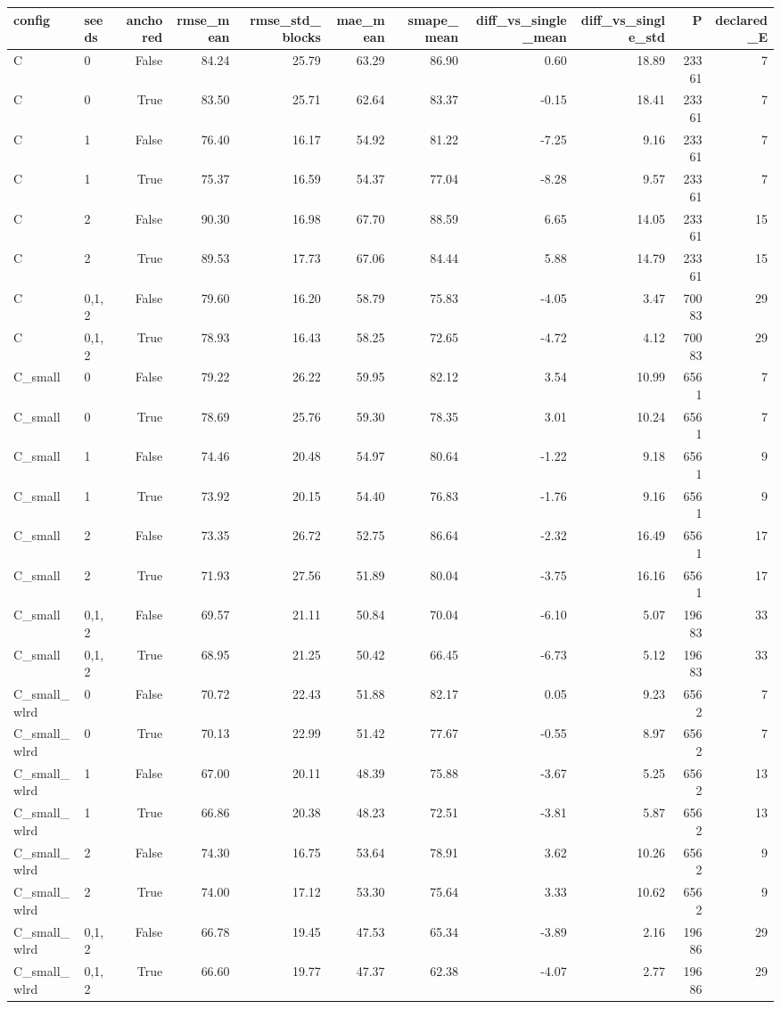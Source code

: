 \begin{tabular}{llrrrrrrrrr}
\toprule
config & seeds & anchored & rmse\_mean & rmse\_std\_blocks & mae\_mean & smape\_mean & diff\_vs\_single\_mean & diff\_vs\_single\_std & P & declared\_E \\
\midrule
C & 0 & False & 84.24 & 25.79 & 63.29 & 86.90 & 0.60 & 18.89 & 23361 & 7 \\
C & 0 & True & 83.50 & 25.71 & 62.64 & 83.37 & -0.15 & 18.41 & 23361 & 7 \\
C & 1 & False & 76.40 & 16.17 & 54.92 & 81.22 & -7.25 & 9.16 & 23361 & 7 \\
C & 1 & True & 75.37 & 16.59 & 54.37 & 77.04 & -8.28 & 9.57 & 23361 & 7 \\
C & 2 & False & 90.30 & 16.98 & 67.70 & 88.59 & 6.65 & 14.05 & 23361 & 15 \\
C & 2 & True & 89.53 & 17.73 & 67.06 & 84.44 & 5.88 & 14.79 & 23361 & 15 \\
C & 0,1,2 & False & 79.60 & 16.20 & 58.79 & 75.83 & -4.05 & 3.47 & 70083 & 29 \\
C & 0,1,2 & True & 78.93 & 16.43 & 58.25 & 72.65 & -4.72 & 4.12 & 70083 & 29 \\
C\_small & 0 & False & 79.22 & 26.22 & 59.95 & 82.12 & 3.54 & 10.99 & 6561 & 7 \\
C\_small & 0 & True & 78.69 & 25.76 & 59.30 & 78.35 & 3.01 & 10.24 & 6561 & 7 \\
C\_small & 1 & False & 74.46 & 20.48 & 54.97 & 80.64 & -1.22 & 9.18 & 6561 & 9 \\
C\_small & 1 & True & 73.92 & 20.15 & 54.40 & 76.83 & -1.76 & 9.16 & 6561 & 9 \\
C\_small & 2 & False & 73.35 & 26.72 & 52.75 & 86.64 & -2.32 & 16.49 & 6561 & 17 \\
C\_small & 2 & True & 71.93 & 27.56 & 51.89 & 80.04 & -3.75 & 16.16 & 6561 & 17 \\
C\_small & 0,1,2 & False & 69.57 & 21.11 & 50.84 & 70.04 & -6.10 & 5.07 & 19683 & 33 \\
C\_small & 0,1,2 & True & 68.95 & 21.25 & 50.42 & 66.45 & -6.73 & 5.12 & 19683 & 33 \\
C\_small\_wlrd & 0 & False & 70.72 & 22.43 & 51.88 & 82.17 & 0.05 & 9.23 & 6562 & 7 \\
C\_small\_wlrd & 0 & True & 70.13 & 22.99 & 51.42 & 77.67 & -0.55 & 8.97 & 6562 & 7 \\
C\_small\_wlrd & 1 & False & 67.00 & 20.11 & 48.39 & 75.88 & -3.67 & 5.25 & 6562 & 13 \\
C\_small\_wlrd & 1 & True & 66.86 & 20.38 & 48.23 & 72.51 & -3.81 & 5.87 & 6562 & 13 \\
C\_small\_wlrd & 2 & False & 74.30 & 16.75 & 53.64 & 78.91 & 3.62 & 10.26 & 6562 & 9 \\
C\_small\_wlrd & 2 & True & 74.00 & 17.12 & 53.30 & 75.64 & 3.33 & 10.62 & 6562 & 9 \\
C\_small\_wlrd & 0,1,2 & False & 66.78 & 19.45 & 47.53 & 65.34 & -3.89 & 2.16 & 19686 & 29 \\
C\_small\_wlrd & 0,1,2 & True & 66.60 & 19.77 & 47.37 & 62.38 & -4.07 & 2.77 & 19686 & 29 \\
\bottomrule
\end{tabular}
